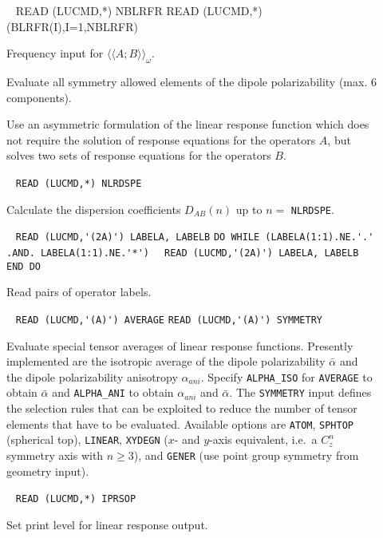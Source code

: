 \begin{description}
%
%
\item[] \verb| |\newline
READ (LUCMD,*) NBLRFR\newline
READ (LUCMD,*) (BLRFR(I),I=1,NBLRFR)

Frequency input for $\langle\langle A;B \rangle\rangle_{\omega}$.
 
\item[] 
Evaluate all symmetry allowed elements of the dipole polarizability
(max. 6 components).
%
%
%
\item[] 
Use an asymmetric formulation of the linear response function which
does not require the solution of response equations for the operators $A$, 
but solves two sets of response equations for the operators $B$.
%
\item[] \verb| |\newline
   \verb|READ (LUCMD,*) NLRDSPE|

   Calculate the dispersion coefficients 
   $D_{AB}(n)$ up to $n = $ \verb+NLRDSPE+.
%
\item[] \verb| |\newline
   \verb|READ (LUCMD,'(2A)') LABELA, LABELB|\newline
   \verb|DO WHILE (LABELA(1:1).NE.'.' .AND. LABELA(1:1).NE.'*')|\newline
   \verb|  READ (LUCMD,'(2A)') LABELA, LABELB|\newline
   \verb|END DO|

Read pairs of operator labels. 
 
\item[] \verb| |\newline
   \verb|READ (LUCMD,'(A)') AVERAGE|\newline
   \verb|READ (LUCMD,'(A)') SYMMETRY|

Evaluate special tensor averages of linear response functions.
Presently implemented are the isotropic average of the dipole polarizability
$\bar{\alpha}$ and the dipole polarizability anisotropy $\alpha_{ani}$.
Specify \verb+ALPHA_ISO+ for \verb+AVERAGE+ to obtain $\bar{\alpha}$ and
\verb+ALPHA_ANI+ to obtain $\alpha_{ani}$ and $\bar{\alpha}$.
The \verb+SYMMETRY+ input defines the selection rules that can be
exploited to reduce the number of tensor elements that have to be
evaluated. Available options are
\verb+ATOM+, \verb+SPHTOP+ (spherical top), \verb+LINEAR+,
\verb+XYDEGN+ ($x$- and $y$-axis equivalent, i.e.\ a $C_z^n$
symmetry axis with $n \ge 3$),  and \verb+GENER+ (use point
group symmetry from geometry input).
 
\item[] \verb| |\newline
   \verb|READ (LUCMD,*) IPRSOP|

   Set print level for linear response output.
 
\end{description}

